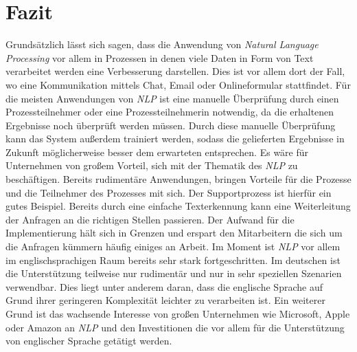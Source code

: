 \chapter{Fazit}
\label{cha:Conclusions}
Grundsätzlich lässt sich sagen, dass die Anwendung von \textit{Natural Language Processing} vor allem in Prozessen in denen viele Daten in Form von Text verarbeitet werden eine Verbesserung darstellen. Dies ist vor allem dort der Fall, wo eine Kommunikation mittels Chat, Email oder Onlineformular stattfindet. Für die meisten Anwendungen von \textit{NLP} ist eine manuelle Überprüfung durch einen Prozessteilnehmer oder eine Prozessteilnehmerin notwendig, da die erhaltenen Ergebnisse noch überprüft werden müssen. Durch diese manuelle Überprüfung kann das System außerdem trainiert werden, sodass die gelieferten Ergebnisse in Zukunft möglicherweise besser dem erwarteten entsprechen. 
Es wäre für Unternehmen von großem Vorteil, sich mit der Thematik des \textit{NLP} zu beschäftigen. Bereits rudimentäre Anwendungen, bringen Vorteile für die Prozesse und die Teilnehmer des Prozesses mit sich. Der Supportprozess ist hierfür ein gutes Beispiel. Bereits durch eine einfache Texterkennung kann eine Weiterleitung der Anfragen an die richtigen Stellen passieren. Der Aufwand für die Implementierung hält sich in Grenzen und erspart den Mitarbeitern die sich um die Anfragen kümmern häufig einiges an Arbeit.
Im Moment ist \textit{NLP} vor allem im englischsprachigen Raum bereits sehr stark fortgeschritten. Im deutschen ist die Unterstützung teilweise nur rudimentär und nur in sehr speziellen Szenarien verwendbar. Dies liegt unter anderem daran, dass die englische Sprache auf Grund ihrer geringeren Komplexität leichter zu verarbeiten ist. Ein weiterer Grund ist das wachsende Interesse von großen Unternehmen wie Microsoft, Apple oder Amazon an \textit{NLP} und den Investitionen die vor allem für die Unterstützung von englischer Sprache getätigt werden.
